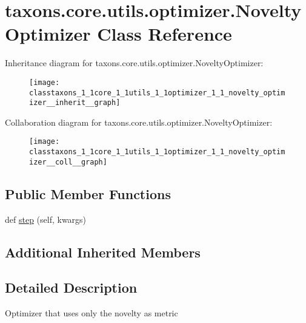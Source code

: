 \hypertarget{classtaxons_1_1core_1_1utils_1_1optimizer_1_1_novelty_optimizer}{}\section{taxons.\+core.\+utils.\+optimizer.\+Novelty\+Optimizer Class Reference}
\label{classtaxons_1_1core_1_1utils_1_1optimizer_1_1_novelty_optimizer}


Inheritance diagram for taxons.\+core.\+utils.\+optimizer.\+Novelty\+Optimizer\+:
\nopagebreak
\begin{figure}[H]
\begin{center}
\leavevmode
\texttt{[image: classtaxons\_1\_1core\_1\_1utils\_1\_1optimizer\_1\_1\_novelty\_optimizer\_\_inherit\_\_graph]}
\end{center}
\end{figure}


Collaboration diagram for taxons.\+core.\+utils.\+optimizer.\+Novelty\+Optimizer\+:
\nopagebreak
\begin{figure}[H]
\begin{center}
\leavevmode
\texttt{[image: classtaxons\_1\_1core\_1\_1utils\_1\_1optimizer\_1\_1\_novelty\_optimizer\_\_coll\_\_graph]}
\end{center}
\end{figure}
\subsection*{Public Member Functions}
\begin{DoxyCompactItemize}
\item 
def \hyperlink{classtaxons_1_1core_1_1utils_1_1optimizer_1_1_novelty_optimizer_a59a64851f93f1f6e6ce30ab9eef76340}{step} (self, kwargs)
\end{DoxyCompactItemize}
\subsection*{Additional Inherited Members}


\subsection{Detailed Description}
\begin{DoxyVerb}Optimizer that uses only the novelty as metric
\end{DoxyVerb}
 

